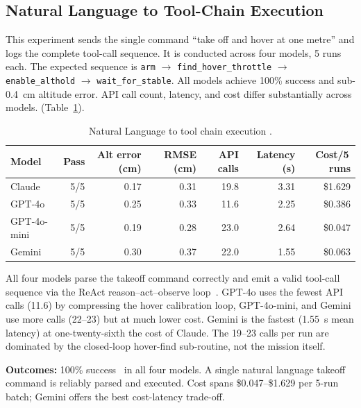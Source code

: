 \subsection{Natural Language to Tool-Chain Execution}
\label{sec:ch3_c1}

This experiment sends the single command ``take off and hover at one metre'' and logs the complete tool-call sequence. 
It is conducted across four models, 5 runs each.
The expected sequence is \texttt{arm} $\to$ \texttt{find\_hover\_throttle} $\to$ \texttt{enable\_althold} $\to$ \texttt{wait\_for\_stable}.
All models achieve 100\% success and sub-0.4~cm altitude error. 
API call count, latency, and cost differ substantially across models. (Table~\ref{tab:ch3_c1}).

\begin{table}[ht]
  \caption{Natural Language to tool chain execution .
    }
  \label{tab:ch3_c1}
  \centering
  \small
  \begin{tabular}{lrrrrrr}
    \toprule
    Model & Pass & Alt error (cm) & RMSE (cm) & API calls & Latency (s) & Cost/5\,runs \\
    \midrule
    Claude       & 5/5 & 0.17 & 0.31 & 19.8 & 3.31 & \$1.629 \\
    GPT-4o       & 5/5 & 0.25 & 0.33 & 11.6 & 2.25 & \$0.386 \\
    GPT-4o-mini  & 5/5 & 0.19 & 0.28 & 23.0 & 2.64 & \$0.047 \\
    Gemini       & 5/5 & 0.30 & 0.37 & 22.0 & 1.55 & \$0.063 \\
    \bottomrule
  \end{tabular}
\end{table}

All four models parse the takeoff command correctly and emit a valid tool-call sequence via the ReAct reason--act--observe loop~\cite{yao2022react}.
GPT-4o uses the fewest API calls (11.6) by compressing the hover calibration loop, GPT-4o-mini, and Gemini use more calls (22--23) but at much lower cost.
Gemini is the fastest (1.55~s mean latency) at one-twenty-sixth the cost of Claude. 
The 19--23 calls per run are dominated by the closed-loop hover-find sub-routine, not the mission itself.

\textbf{Outcomes:} 100\% success \ in all four models. A single natural language takeoff command is reliably parsed and executed. 
Cost spans \$0.047--\$1.629 per 5-run batch; Gemini offers the best cost-latency trade-off.

